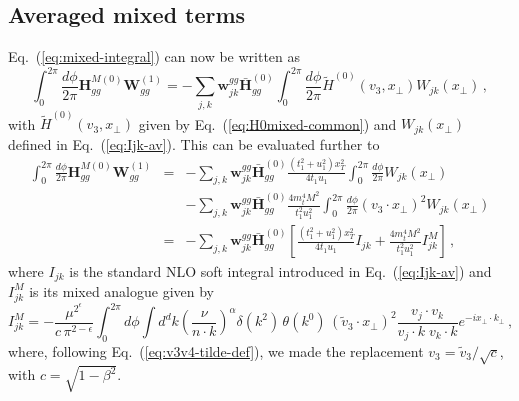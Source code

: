 \documentclass[a4paper,11pt]{report}
\numberwithin{equation}{section}
\newcommand{\mixed}{{M}}
\begin{document}
\subsection{Averaged mixed terms}

Eq.~(\ref{eq:mixed-integral}) can now be written as
%
\begin{equation}
  \int_0^{2\pi} \frac{d\phi}{2\pi}
  \bm{H}^{M(0)}_{gg}\bm{W}^{(1)}_{gg}
  =
  - \sum_{j,k} \bm{w}^{gg}_{jk}
  \bm{\bar H}_{gg}^{(0)} 
  \int_0^{2\pi} \frac{d\phi}{2\pi}
  \tilde H^{(0)}(v_3, x_\perp)
  W_{jk} (x_\perp)\,,
\end{equation}
%
with $\tilde H^{(0)}(v_3, x_\perp)$ given by Eq.~(\ref{eq:H0mixed-common}) and
$W_{jk} (x_\perp)$ defined in Eq.~(\ref{eq:Ijk-av}). This can be evaluated
further to
%
\begin{eqnarray}
  \int_0^{2\pi} \frac{d\phi}{2\pi}
  \bm{H}^{M(0)}_{gg}\bm{W}^{(1)}_{gg}
  & = &
  - \sum_{j,k} \bm{w}^{gg}_{jk}
  \bm{\bar H}_{gg}^{(0)} 
  \frac{(t_1^2+u_1^2) x_T^2}{4 t_1 u_1}
  \int_0^{2\pi} \frac{d\phi}{2\pi}
  W_{jk} (x_\perp)
  \nonumber \\
  & & 
  - \sum_{j,k} \bm{w}^{gg}_{jk}
  \bm{\bar H}_{gg}^{(0)} 
  \frac{4 m_t^4 M^2 }{t_1^2 u_1^2}
  \int_0^{2\pi} \frac{d\phi}{2\pi}
  (v_3 \cdot x_\perp)^2
  W_{jk} (x_\perp)
  \nonumber \\
  & = &
  - \sum_{j,k} \bm{w}^{gg}_{jk}
  \bm{\bar H}_{gg}^{(0)} 
  \left[
  \frac{(t_1^2+u_1^2) x_T^2}{4 t_1 u_1} I_{jk}
  + \frac{4 m_t^4 M^2 }{t_1^2 u_1^2} I^\mixed_{jk}
  \right]\,,
\end{eqnarray}
%
where $I_{jk}$ is the standard NLO soft integral introduced in
Eq.~(\ref{eq:Ijk-av}) and $I^\mixed_{jk}$ is its mixed analogue given by
%
\begin{equation}
  I^\mixed_{jk} = 
  -\frac{\mu^{2^\epsilon}}{c\, \pi^{2-\epsilon}}
  \int_0^{2\pi} d\phi
  \int d^d k
  \left(\frac{\nu}{n\cdot k}\right)^\alpha
  \delta(k^2)\, \theta(k^0)\,
  (\tilde v_3 \cdot x_\perp)^2
  \frac{v_j \cdot v_k}{v_j \cdot k\; v_k \cdot k}
  e^{-i x_\perp \cdot k_\perp}\,,
  \label{eq:Ijk-avmixed}
\end{equation}
%
where, following Eq.~(\ref{eq:v3v4-tilde-def}), we made the replacement $v_3 =
\tilde v_3 / \sqrt{c} $, with $c = \sqrt{1-\beta^2}$.
\end{document}
